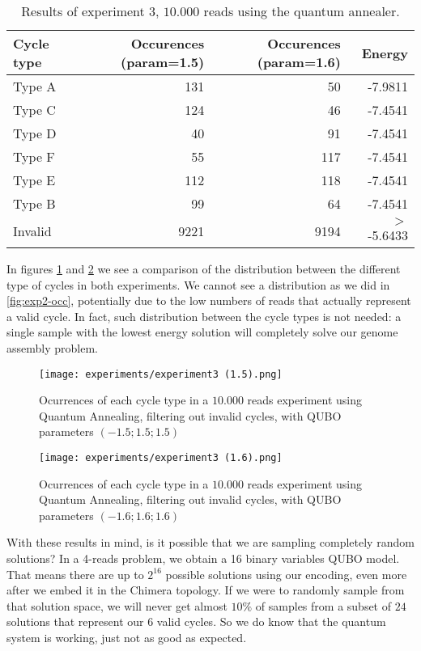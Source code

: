 \begin{table}[H]
	\centering
	\begin{tabular}{lrrr}
		\textbf{Cycle type} & \textbf{Occurences (param=1.5)} & \textbf{Occurences (param=1.6)} & \textbf{Energy} \\
		\hline
		Type A	& 131	& 50	& -7.9811	\\
		Type C	& 124	& 46	& -7.4541	\\
		Type D	& 40	& 91	& -7.4541	\\
		Type F	& 55	& 117	& -7.4541	\\
		Type E	& 112	& 118	& -7.4541	\\
		Type B	& 99	& 64	& -7.4541	\\    
		Invalid & 9221	& 9194	& $>$ -5.6433                         
	\end{tabular}
	\caption{Results of experiment 3, $10.000$ reads using the quantum annealer.}
	\label{tab:exp3}
\end{table}

In figures \ref{fig:exp3-occ1} and \ref{fig:exp3-occ2} we see a comparison of the distribution between the different type of cycles in both experiments. We cannot see a distribution as we did in \ref{fig:exp2-occ}, potentially due to the low numbers of reads that actually represent a valid cycle. In fact, such distribution between the cycle types is not needed: a single sample with the lowest energy solution will completely solve our genome assembly problem.

\begin{figure}[H]
	\texttt{[image: experiments/experiment3 (1.5).png]}
	\centering
	\caption{Ocurrences of each cycle type in a $10.000$ reads experiment using Quantum Annealing, filtering out invalid cycles, with QUBO parameters $(-1.5; 1.5; 1.5)$}
	\label{fig:exp3-occ1}
\end{figure}

\begin{figure}[H]
	\texttt{[image: experiments/experiment3 (1.6).png]}
	\centering
	\caption{Ocurrences of each cycle type in a $10.000$ reads experiment using Quantum Annealing, filtering out invalid cycles, with QUBO parameters $(-1.6; 1.6; 1.6)$}
	\label{fig:exp3-occ2}
\end{figure}

With these results in mind, is it possible that we are sampling completely random solutions? In a 4-reads problem, we obtain a 16 binary variables QUBO model. That means there are up to $2^{16}$ possible solutions using our encoding, even more after we embed it in the Chimera topology. If we were to randomly sample from that solution space, we will never get almost $10\%$ of samples from a subset of $24$ solutions that represent our $6$ valid cycles. So we do know that the quantum system is working, just not as good as expected.

